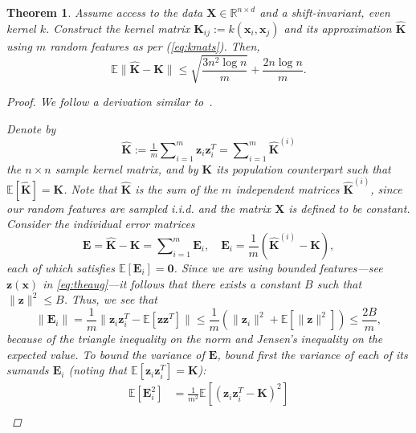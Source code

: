 \documentclass{article}
\newtheorem{theorem}{Theorem}
\begin{document}
  \begin{theorem}\label{thm:pca}
    Assume access to the data $\bm X \in \mathbb{R}^{n \times d}$ and a
    shift-invariant, even kernel $k$. Construct the
    kernel matrix $\bm K_{ij} := k(\bm x_i, \bm x_j)$ and its approximation
    $\hat{\bm K}$ using $m$ random features as per (\ref{eq:kmats}). Then,
    \begin{equation}\label{eq:pcaconc}
        \mathbb{E} \| {\hat{\bm K}} - \bm K\| \leq \sqrt{\frac{3n^2\log
        n}{m}} + \frac{2n\log n}{m}.
    \end{equation}
    \begin{proof} 
    We follow a derivation similar to~\citet{Tropp12b}. 
    
    Denote by
    \begin{equation*}
      {\hat{\bm K}} := \tfrac{1}{m} \sum\nolimits_{i=1}^m \bm z_i\bm z_i^T =
      \sum\nolimits_{i=1}^m
      {\hat{\bm K}^{(i)}}
    \end{equation*}
    the $n \times n$ sample kernel matrix, and by $\bm {K}$ its population
    counterpart such that $\mathbb{E}[{\hat{\bm K}}] = \bm K$. Note that
    ${\hat{\bm K}}$ is the sum of the $m$ independent matrices ${\hat{\bm
    K}^{(i)}}$, since our random features are sampled i.i.d. and the matrix
    $\bm X$ is defined to be constant.  Consider the individual error
    matrices
    \begin{equation*}
      \bm E = {\hat{\bm K}} - \bm K = \sum\nolimits_{i=1}^m \bm E_i, \quad \bm
      E_i = \frac{1}{m} ({\hat{\bm K}^{(i)}}- \bm K),
    \end{equation*}
    each of which satisfies $\mathbb{E}[\bm E_i] = \bm 0$. Since we are using
    bounded features---see $\bm z(\bm x)$ in \eqref{eq:theaug}---it follows that
    there exists a constant $B$ such that $\|\bm z\|^2 \leq B$. Thus, we see
    that
    \begin{equation*}
      \| \bm E_i \| = \frac{1}{m} \|\bm z_i\bm z_i^T - \mathbb{E}[\bm z\bm
      z^T]\| \leq \frac{1}{m}(\|\bm z_i\|^2 + \mathbb{E}[\|\bm z\|^2]) \leq
      \frac{2B}{m},
    \end{equation*}
    because of the triangle inequality on the norm and Jensen's inequality on
    the expected value.  To bound the variance of $\bm E$, bound  first the
    variance of each of its sumands $\bm E_i$ (noting that
    $\mathbb{E}[\bm{z}_i\bm{z}_i^T]=\bm{K}$):
      \begin{align*}
        \mathbb{E}[\bm E_i^2] &= \frac{1}{m^2} \mathbb{E}\left[(\bm z_i\bm z_i^T
        - \bm K)^2\right] \\

\end{align*}
\end{proof}
\end{theorem}
\end{document}
